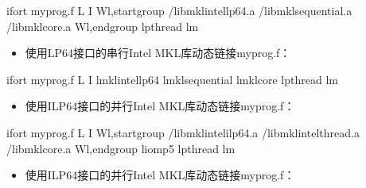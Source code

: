 \documentclass[a4paper,12pt,english]{sphinxmanual}
\begin{document}
\begin{sphinxVerbatim}[commandchars=\\\{\}]
ifort myprog.f \PYGZhy{}L \PYGZhy{}I 
\PYGZhy{}Wl,\PYGZhy{}\PYGZhy{}start\PYGZhy{}group /libmkl\PYGZus{}intel\PYGZus{}lp64.a /libmkl\PYGZus{}sequential.a 
/libmkl\PYGZus{}core.a \PYGZhy{}Wl,\PYGZhy{}\PYGZhy{}end\PYGZhy{}group \PYGZhy{}lpthread \PYGZhy{}lm
\end{sphinxVerbatim}
\begin{itemize}
\item {} 
\sphinxAtStartPar
使用LP64接口的串行Intel MKL库动态链接myprog.f：

\end{itemize}

\begin{sphinxVerbatim}[commandchars=\\\{\}]
ifort myprog.f \PYGZhy{}L \PYGZhy{}I 
\PYGZhy{}lmkl\PYGZus{}intel\PYGZus{}lp64 \PYGZhy{}lmkl\PYGZus{}sequential \PYGZhy{}lmkl\PYGZus{}core \PYGZhy{}lpthread \PYGZhy{}lm
\end{sphinxVerbatim}
\begin{itemize}
\item {} 
\sphinxAtStartPar
使用ILP64接口的并行Intel MKL库动态链接myprog.f：

\end{itemize}

\begin{sphinxVerbatim}[commandchars=\\\{\}]
ifort myprog.f \PYGZhy{}L \PYGZhy{}I 
\PYGZhy{}Wl,\PYGZhy{}\PYGZhy{}start\PYGZhy{}group /libmkl\PYGZus{}intel\PYGZus{}ilp64.a /libmkl\PYGZus{}intel\PYGZus{}thread.a 
/libmkl\PYGZus{}core.a \PYGZhy{}Wl,\PYGZhy{}\PYGZhy{}end\PYGZhy{}group \PYGZhy{}liomp5 \PYGZhy{}lpthread \PYGZhy{}lm
\end{sphinxVerbatim}
\begin{itemize}
\item {} 
\sphinxAtStartPar
使用ILP64接口的并行Intel MKL库动态链接myprog.f：

\end{itemize}
\end{document}

